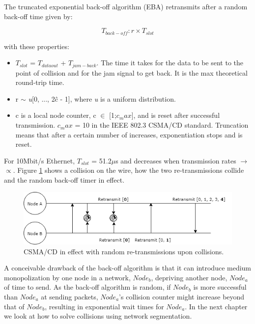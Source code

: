 \noindent The truncated exponential back-off algorithm (EBA) retransmits after a random back-off time given by:

\[ T_{back-off}: r \times T_{slot} \]

\noindent with these properties:

\begin{itemize}
	\item $T_{slot}$ = $T_{dataout}$ + $T_{jam-back}$. The time it takes for the data to be sent to the point of collision and for the jam signal to get back. It is the max theoretical round-trip time.
	\item r $\sim$ \textit{u}[0, ..., 2\^{c} - 1], where \textit{u} is a uniform distribution.
	\item c is a local node counter, c $\in$ [1;$c_max$], and is reset after successful transmission. $c_max$ = 10 in the IEEE 802.3 CSMA/CD standard. Truncation means that after a certain number of increases, exponentiation stops and is reset.
\end{itemize}

\noindent For 10Mbit/s Ethernet, $T_{slot}$ = 51.2$\mu$s and decreases when transmission rates $\longrightarrow$ $\propto$. Figure \ref{fig:csmacd} shows a collision on the wire, how the two re-transmissions collide and the random back-off timer in effect.

\begin{figure}[H]\label{}
	\centering
	\includegraphics[scale=0.5]{realTimeEthernet/CSMACD.png}
	\caption{CSMA/CD in effect with random re-transmissions upon collisions.}
	\label{fig:csmacd}
\end{figure}
\noindent A conceivable drawback of the back-off algorithm is that it can introduce medium monopolization by one node in a network, $Node_{b}$, depriving another node, $Node_{a}$ of time to send. As the back-off algorithm is random, if $Node_{b}$ is more successful than $Node_{a}$ at sending packets, $Node_{a}$'s collision counter might increase beyond that of $Node_{b}$, resulting in exponential wait times for $Node_{a}$. In the next chapter we look at how to solve collisions using network segmentation.

